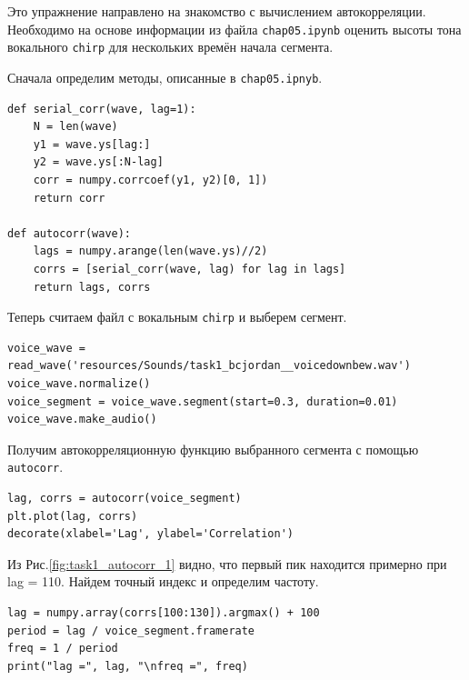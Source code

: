 \documentclass[a4paper, 14pt]{extarticle}
\begin{document}
    Это упражнение направлено на знакомство с вычислением автокорреляции.
    Необходимо на основе информации из файла \texttt{chap05.ipynb} оценить высоты тона вокального \texttt{chirp}
    для нескольких времён начала сегмента.

    Сначала определим методы, описанные в \texttt{chap05.ipnyb}.

    \begin{lstlisting}[caption= Методы \texttt{serial\_corr} и \texttt{autocorr}., label={lst:task1_function}]
def serial_corr(wave, lag=1):
    N = len(wave)
    y1 = wave.ys[lag:]
    y2 = wave.ys[:N-lag]
    corr = numpy.corrcoef(y1, y2)[0, 1])
    return corr

def autocorr(wave):
    lags = numpy.arange(len(wave.ys)//2)
    corrs = [serial_corr(wave, lag) for lag in lags]
    return lags, corrs      \end{lstlisting}

    Теперь считаем файл с вокальным \texttt{chirp} и выберем сегмент.

    \begin{lstlisting}[caption= Чтение файла и выбор сегмента., label={lst:task1_read}]
voice_wave = read_wave('resources/Sounds/task1_bcjordan__voicedownbew.wav')
voice_wave.normalize()
voice_segment = voice_wave.segment(start=0.3, duration=0.01)
voice_wave.make_audio() \end{lstlisting}

    Получим автокорреляционную функцию выбранного сегмента с помощью \texttt{autocorr}.

    \begin{lstlisting}[caption= Получение автокорреляционной функции выбранного сегмента., label={lst:task1_autocorr_1}]
lag, corrs = autocorr(voice_segment)
plt.plot(lag, corrs)
decorate(xlabel='Lag', ylabel='Correlation')    \end{lstlisting}

    Из Рис.\ref{fig:task1_autocorr_1} видно, что первый пик находится примерно при lag = 110.
    Найдем точный индекс и определим частоту.

    \begin{lstlisting}[caption= Поиск пика и вычисление его частоты., label={lst:task1_freq_1}]
lag = numpy.array(corrs[100:130]).argmax() + 100
period = lag / voice_segment.framerate
freq = 1 / period
print("lag =", lag, "\nfreq =", freq)   \end{lstlisting}
\end{document}

